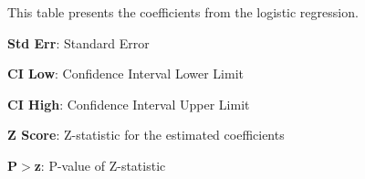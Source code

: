 \documentclass[11pt]{article}
\begin{document}
\begin{table}[h]
\caption{\protect\hyperlink{file-table-1-pkl}{Test of association between state representation and interaction on Twitter.}}
\label{table:StateTwitterInteraction}
\begin{threeparttable}
\renewcommand{\TPTminimum}{\linewidth}
\begin{tablenotes}
\footnotesize
\item This table presents the coefficients from the logistic regression.
\item \textbf{Std Err}: Standard Error
\item \textbf{CI Low}: Confidence Interval Lower Limit
\item \textbf{CI High}: Confidence Interval Upper Limit
\item \textbf{Z Score}: Z-statistic for the estimated coefficients
\item \textbf{P$>$\textbar{}z\textbar{}}: P-value of Z-statistic
\end{tablenotes}
\end{threeparttable}
\end{table}
\end{document}
